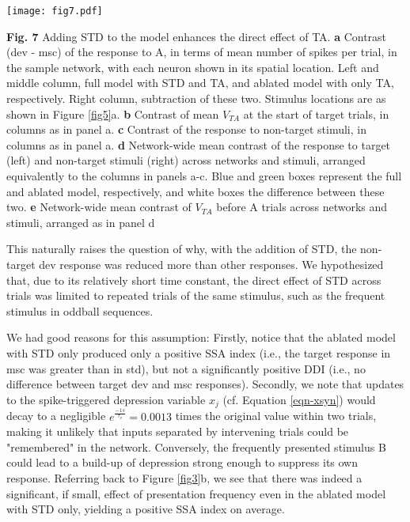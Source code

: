 \documentclass[pdflatex,referee,iicol,sn-basic]{sn-jnl}
\theoremstyle{thmstyleone}%
\theoremstyle{thmstyletwo}%
\theoremstyle{thmstylethree}%
\begin{document}
\begin{figure*}%
    \centering
    \texttt{[image: fig7.pdf]}
    \caption{}
    \label{fig7}
\end{figure*}
\textbf{Fig. 7} Adding STD to the model enhances the direct effect of TA.
\textbf{a} Contrast (dev - msc) of the response to A, in terms of mean number of spikes per trial, in the sample network, with each neuron shown in its spatial location. Left and middle column, full model with STD and TA, and ablated model with only TA, respectively. Right column, subtraction of these two. Stimulus locations are as shown in Figure \ref{fig5}a.
\textbf{b} Contrast of mean $V_{TA}$ at the start of target trials, in columns as in panel a.
\textbf{c} Contrast of the response to non-target stimuli, in columns as in panel a.
\textbf{d} Network-wide mean contrast of the response to target (left) and non-target stimuli (right) across networks and stimuli, arranged equivalently to the columns in panels a-c. Blue and green boxes represent the full and ablated model, respectively, and white boxes the difference between these two.
\textbf{e} Network-wide mean contrast of $V_{TA}$ before A trials across networks and stimuli, arranged as in panel d

This naturally raises the question of why, with the addition of STD, the non-target dev response was reduced more than other responses. We hypothesized that, due to its relatively short time constant, the direct effect of STD across trials was limited to repeated trials of the same stimulus, such as the frequent stimulus in oddball sequences.

We had good reasons for this assumption: Firstly, notice that the ablated model with STD only produced only a positive SSA index (i.e., the target response in msc was greater than in std), but not a significantly positive DDI (i.e., no difference between target dev and msc responses). Secondly, we note that updates to the spike-triggered depression variable $x_j$ (cf. Equation \ref{eqn-xsyn}) would decay to a negligible $e^\frac{-1 s}{\tau_x} = 0.0013$ times the original value within two trials, making it unlikely that inputs separated by intervening trials could be "remembered" in the network. Conversely, the frequently presented stimulus B could lead to a build-up of depression strong enough to suppress its own response. Referring back to Figure \ref{fig3}b, we see that there was indeed a significant, if small, effect of presentation frequency even in the ablated model with STD only, yielding a positive SSA index on average.
\end{document}
